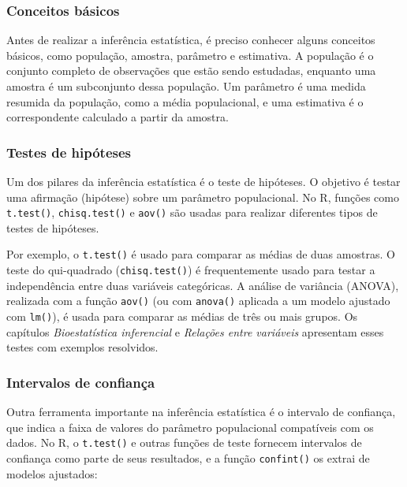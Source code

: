 \documentclass[
]{book}
\newenvironment{Shaded}{\begin{snugshade}}{\end{snugshade}}
\newcommand{\CommentTok}[1]{\textcolor[rgb]{0.56,0.35,0.01}{\textit{#1}}}
\newcommand{\FunctionTok}[1]{\textcolor[rgb]{0.13,0.29,0.53}{\textbf{#1}}}
\newcommand{\NormalTok}[1]{#1}
\newcommand{\SpecialCharTok}[1]{\textcolor[rgb]{0.81,0.36,0.00}{\textbf{#1}}}
\begin{document}
\subsubsection{Conceitos básicos}\label{conceitos-buxe1sicos}

Antes de realizar a inferência estatística, é preciso conhecer alguns conceitos básicos, como população, amostra, parâmetro e estimativa. A população é o conjunto completo de observações que estão sendo estudadas, enquanto uma amostra é um subconjunto dessa população. Um parâmetro é uma medida resumida da população, como a média populacional, e uma estimativa é o correspondente calculado a partir da amostra.

\subsubsection{Testes de hipóteses}\label{testes-de-hipuxf3teses-1}

Um dos pilares da inferência estatística é o teste de hipóteses. O objetivo é testar uma afirmação (hipótese) sobre um parâmetro populacional. No R, funções como \texttt{t.test()}, \texttt{chisq.test()} e \texttt{aov()} são usadas para realizar diferentes tipos de testes de hipóteses.

Por exemplo, o \texttt{t.test()} é usado para comparar as médias de duas amostras. O teste do qui-quadrado (\texttt{chisq.test()}) é frequentemente usado para testar a independência entre duas variáveis categóricas. A análise de variância (ANOVA), realizada com a função \texttt{aov()} (ou com \texttt{anova()} aplicada a um modelo ajustado com \texttt{lm()}), é usada para comparar as médias de três ou mais grupos. Os capítulos \emph{Bioestatística inferencial} e \emph{Relações entre variáveis} apresentam esses testes com exemplos resolvidos.

\subsubsection{Intervalos de confiança}\label{intervalos-de-confianuxe7a}

Outra ferramenta importante na inferência estatística é o intervalo de confiança, que indica a faixa de valores do parâmetro populacional compatíveis com os dados. No R, o \texttt{t.test()} e outras funções de teste fornecem intervalos de confiança como parte de seus resultados, e a função \texttt{confint()} os extrai de modelos ajustados:

\begin{Shaded}
\end{Shaded}
\end{document}
